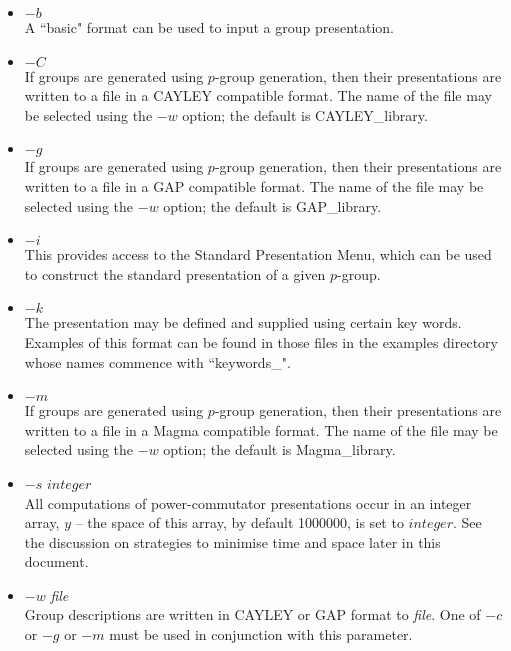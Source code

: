 \begin{itemize}

\item $-b$  \\
      A ``basic" format can be used to input a group presentation.

\item $-C$  \\
      If groups are generated using $p$-group generation, then 
      their presentations are written to a file
      in a CAYLEY compatible format.
      The name of the file may be selected using the $-w$ option;
      the default is CAYLEY\_library.

\item $-g$  \\
      If groups are generated using $p$-group generation, then 
      their presentations are written to a file
      in a {\sf GAP} compatible format.
      The name of the file may be selected using the $-w$ option;
      the default is GAP\_library.

\item $-i$ \\
      This provides access to the Standard Presentation Menu,
      which can be used to construct the standard presentation
      of a given $p$-group.

\item $-k$ \\
      The presentation may be defined and supplied using certain
      key words. Examples of this format can be found in those 
      files in the examples directory whose names commence with 
      ``keywords\_".

\item $-m$  \\
      If groups are generated using $p$-group generation, then 
      their presentations are written to a file
      in a {\sc Magma} compatible format.
      The name of the file may be selected using the $-w$ option;
      the default is Magma\_library.

\item $-s$ $integer$ \\
      All computations of power-commutator presentations occur
      in an integer array, $y$ -- the space of this array,  by 
      default 1000000, is set to $integer$. See the discussion
      on strategies to minimise time and space later in this document.

\item $-w$ {\em file} \\
      Group descriptions are written in CAYLEY or {\sf GAP} format
      to {\em file}. One of $-c$ or $-g$ or $-m$ must be used in
      conjunction with this parameter.

\end{itemize}

